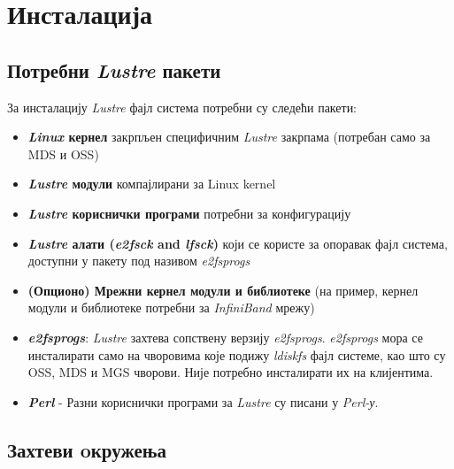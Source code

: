 \section{Инсталација}
\subsection{Потребни   \textit{Lustre} пакети}

За инсталацију   \textit{Lustre} фајл система потребни су следећи пакети:

\begin{itemize}
\item  \textbf{\textit{Linux} кернел} закрпљен специфичним   \textit{Lustre}  закрпама (потребан само за MDS и OSS)

\item \textbf{   \textit{Lustre}  модули} компајлирани за  Linux kernel

\item   \textbf{ \textit{Lustre}  кориснички програми }потребни за конфигурацију

\item    \textbf{\textit{Lustre}  алати (\textit{e2fsck} and \textit{lfsck}) } који се користе за опоравак  фајл система, доступни у пакету под називом \textit{e2fsprogs}

\item \textbf{(Опционо) Мрежни кернел модули  и библиотеке }(на пример, кернел модули и библиотеке потребни за \textit{InfiniBand} мрежу)

\item  \textbf{\textit{e2fsprogs}}:   \textit{Lustre}  захтева сопствену верзију \textit{e2fsprogs}. \textit{e2fsprogs} мора се инсталирати само на чворовима које подижу \textit{ldiskfs} фајл системе, као што су OSS, MDS  и MGS чворови. Није потребно инсталирати их на клијентима.

\item \textbf{ \textit{\textit{Perl}}} - Разни кориснички програми за   \textit{Lustre} су писани у \textit{Perl-у}.

\end{itemize}


\subsection{Захтеви oкружења}

